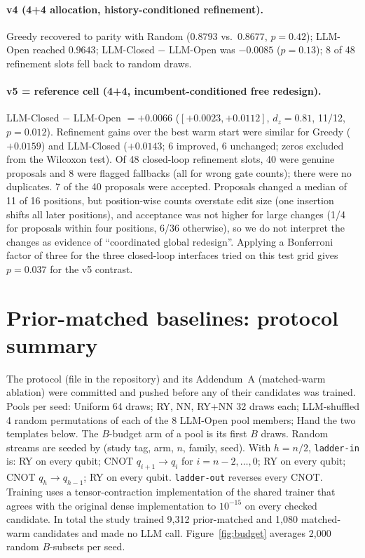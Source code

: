 \documentclass[11pt]{article}
\begin{document}
\paragraph{v4 (4+4 allocation, history-conditioned refinement).} Greedy recovered to
parity with Random ($0.8793$ vs.\ $0.8677$, $p=0.42$); LLM-Open reached $0.9643$; LLM-Closed
$-$ LLM-Open was $-0.0085$ ($p=0.13$); 8 of 48 refinement slots fell back to random draws.

\paragraph{v5 = reference cell (4+4, incumbent-conditioned free redesign).}
LLM-Closed $-$ LLM-Open $=+0.0066$ ($[+0.0023,+0.0112]$, $d_z=0.81$, 11/12,
$p=0.012$). Refinement gains over the best warm start were similar for Greedy
($+0.0159$) and LLM-Closed ($+0.0143$; 6 improved, 6 unchanged; zeros excluded from the
Wilcoxon test). Of 48 closed-loop refinement slots, 40 were genuine proposals and 8
were flagged fallbacks (all for wrong gate counts); there were no duplicates.
7 of the 40 proposals were accepted. Proposals changed a median of 11 of 16 positions,
but position-wise counts overstate edit size (one insertion shifts all later
positions), and acceptance was not higher for large changes (1/4 for proposals
within four positions, 6/36 otherwise), so we do not interpret the changes as evidence
of ``coordinated global redesign''.
Applying a Bonferroni factor of three for the three closed-loop interfaces tried on
this test grid gives $p=0.037$ for the v5 contrast.

\section{Prior-matched baselines: protocol summary}
\label{app:prior}

The protocol (file  in the repository) and its
Addendum~A (matched-warm ablation) were committed and pushed before any of their
candidates was trained. Pools per seed: Uniform 64 draws; RY, NN, RY+NN 32 draws
each; LLM-shuffled 4 random permutations of each of the 8 LLM-Open pool members; Hand
the two templates below. The $B$-budget arm of a pool is its first $B$ draws.
Random streams are seeded by (study tag, arm, $n$, family, seed).
With $h=n/2$, \texttt{ladder-in} is: RY on every qubit; CNOT $q_{i+1}\to q_i$ for
$i=n-2,\dots,0$; RY on every qubit; CNOT $q_h\to q_{h-1}$; RY on every qubit.
\texttt{ladder-out} reverses every CNOT.
Training uses a tensor-contraction implementation of the shared trainer that agrees
with the original dense implementation to $10^{-15}$ on every checked candidate.
In total the study trained 9{,}312 prior-matched and 1{,}080 matched-warm candidates and
made no LLM call. Figure~\ref{fig:budget} averages 2{,}000 random $B$-subsets per seed.
\end{document}
